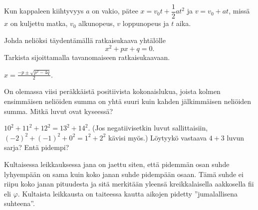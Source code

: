 \begin{tehtavasivu}
\begin{tehtava}
    Kun kappaleen kiihtyvyys $a$ on vakio, pätee $x = v_0t + \dfrac{1}{2}at^2$ ja $v = v_0 + at$, missä $x$ on kuljettu matka, $v_0$ alkunopeus, $v$ loppunopeus ja $t$ aika.
    \begin{vastaus}
    \end{vastaus}
\end{tehtava}

\begin{tehtava}
	Johda neliöksi täydentämällä ratkaisukaava yhtälölle
	\[ x^2 +px+q=0. \]
	Tarkista sijoittamalla tavanomaiseen ratkaisukaavaan.
	\begin{vastaus}
		$x=\frac{-p \pm \sqrt{p^2-4q}}{2}$.
	\end{vastaus}
\end{tehtava}

\begin{tehtava} %
On olemassa viisi peräkkäistä positiivista kokonaislukua, joista kolmen ensimmäisen neliöiden summa on yhtä suuri kuin kahden jälkimmäisen neliöiden summa. Mitkä luvut ovat kyseessä?
    \begin{vastaus}
		$10^2+11^2+12^2 = 13^2 + 14^2$.
    	(Jos negatiivisetkin luvut sallittaisiin, $(-2)^2+(-1)^2+0^2 = 1^2 + 2^2$ kävisi myös.) Löytyykö vastaava $4 + 3$ luvun sarja? Entä pidempi?
    \end{vastaus}
\end{tehtava}

\begin{tehtava}
    Kultaisessa leikkauksessa jana on jaettu siten, että pidemmän osan suhde lyhyempään on sama kuin koko janan suhde pidempään osaan. Tämä suhde ei riipu koko janan pituudesta ja sitä merkitään yleensä kreikkalaisella aakkosella fii eli $\varphi$. Kultaista leikkausta on taiteessa kautta aikojen pidetty ''jumalallisena suhteena''. %
    \begin{vastaus}
    \end{vastaus}
\end{tehtava}


\end{tehtavasivu}
